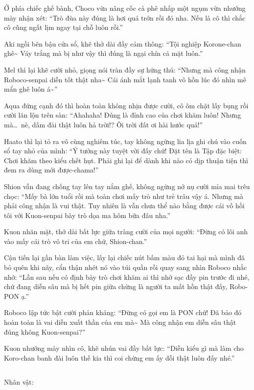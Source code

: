 \documentclass[../main.tex]{subfiles}
\begin{document}
Ở phía chiếc ghế bành, Choco vừa nâng cốc cà phê nhấp một ngụm vừa nhướng mày nhận xét: ``Trò đùa này đúng là hơi quá trớn rồi đó nha. Nếu là cô thì chắc cô cũng ngất lịm ngay tại chỗ luôn rồi.''

Aki ngồi bên bậu cửa sổ, khẽ thở dài đầy cảm thông: ``Tội nghiệp Korone-chan ghê\~{} Váy trắng mà bị như vậy thì đúng là ngại chín cả mặt luôn.''

Mel thì lại khẽ cười nhỏ, giọng nói tràn đầy sự hứng thú: ``Nhưng mà công nhận Roboco-senpai diễn tốt thật nha\~{} Cái ánh mắt lạnh tanh vô hồn lúc đó nhìn mê mẩn ghê luôn á\~{}''

Aqua đứng cạnh đó thì hoàn toàn không nhịn được cười, cô ôm chặt lấy bụng rồi cười lăn lộn trên sàn: ``Ahahaha! Đúng là đỉnh cao của chơi khăm luôn! Nhưng mà\dots\ nè, dấm đài thật luôn hả trời!? Ôi trời đất ơi hài hước quá!''

Haato thì lại tỏ ra vô cùng nghiêm túc, tay không ngừng lia lịa ghi chú vào cuốn sổ tay nhỏ của mình: ``Ý tưởng này tuyệt vời đấy chứ! Đặt tên là Tập đặc biệt: Chơi khăm theo kiểu chết hụt. Phải ghi lại để dành khi nào có dịp thuận tiện thì đem ra dùng mới được-chama!''

Shion vẫn đang chống tay lên tay nắm ghế, không ngừng nở nụ cười mỉa mai trêu chọc: ``Mấy bà lớn tuổi rồi mà toàn chơi mấy trò như trẻ trâu vậy á. Nhưng mà phải công nhận là vui thật. Tuy nhiên là vẫn chưa thể nào bằng được cái vố hồi tôi với Kuon-senpai bày trò dọa ma hôm bữa đâu nha.''

Kuon nhăn mặt, thở dài bất lực giữa tràng cười của mọi người: ``Đừng có lôi anh vào mấy cái trò vô tri của em chứ, Shion-chan.''

Cậu tiến lại gần bàn làm việc, lấy lại chiếc nút bấm màu đỏ tai hại mà mình đã bỏ quên khi nãy, cẩn thận nhét nó vào túi quần rồi quay sang nhìn Roboco nhắc nhở: ``Lần sau nếu có định bày trò chơi khăm ai thì nhớ sạc đầy pin trước đi nhé, chứ đang diễn sâu mà bị hết pin giữa chừng là người ta mất hồn thật đấy, Robo-PON ạ.''

Roboco lập tức bật cười phản kháng: ``Đừng có gọi em là PON chứ! Đã bảo đó hoàn toàn là vai diễn xuất thần của em mà\~{} Mà công nhận em diễn sâu thật đúng không Kuon-senpai?''

Kuon nhướng mày nhìn cô, khẽ nhún vai đầy bất lực: ``Diễn kiểu gì mà làm cho Koro-chan banh đài luôn thế kia thì coi chừng em ấy dỗi thật luôn đấy nhé.''

\newpage

\subsection*{\label{ep-C2.III}}
\begin{center}
  {\caviar\fontsize{12pt}{12pt}\selectfont Nhân vật:    }
\end{center}
\end{document}

